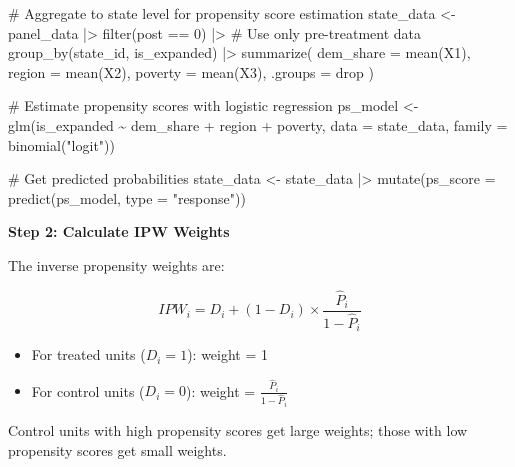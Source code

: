 \documentclass[
  letterpaper,
  DIV=11,
  numbers=noendperiod]{scrreprt}
\newenvironment{Shaded}{\begin{snugshade}}{\end{snugshade}}
\newcommand{\AttributeTok}[1]{\textcolor[rgb]{0.40,0.45,0.13}{#1}}
\newcommand{\CommentTok}[1]{\textcolor[rgb]{0.37,0.37,0.37}{#1}}
\newcommand{\DecValTok}[1]{\textcolor[rgb]{0.68,0.00,0.00}{#1}}
\newcommand{\FunctionTok}[1]{\textcolor[rgb]{0.28,0.35,0.67}{#1}}
\newcommand{\NormalTok}[1]{\textcolor[rgb]{0.00,0.23,0.31}{#1}}
\newcommand{\OtherTok}[1]{\textcolor[rgb]{0.00,0.23,0.31}{#1}}
\newcommand{\SpecialCharTok}[1]{\textcolor[rgb]{0.37,0.37,0.37}{#1}}
\newcommand{\StringTok}[1]{\textcolor[rgb]{0.13,0.47,0.30}{#1}}
\providecommand{\tightlist}{%
  \setlength{\itemsep}{0pt}\setlength{\parskip}{0pt}}
\begin{document}
\begin{Shaded}
\begin{Highlighting}[]
\CommentTok{\# Aggregate to state level for propensity score estimation}
\NormalTok{state\_data }\OtherTok{\textless{}{-}}\NormalTok{ panel\_data }\SpecialCharTok{|\textgreater{}}
    \FunctionTok{filter}\NormalTok{(post }\SpecialCharTok{==} \DecValTok{0}\NormalTok{) }\SpecialCharTok{|\textgreater{}}  \CommentTok{\# Use only pre{-}treatment data}
    \FunctionTok{group\_by}\NormalTok{(state\_id, is\_expanded) }\SpecialCharTok{|\textgreater{}}
    \FunctionTok{summarize}\NormalTok{(}
        \AttributeTok{dem\_share =} \FunctionTok{mean}\NormalTok{(X1),}
        \AttributeTok{region =} \FunctionTok{mean}\NormalTok{(X2),}
        \AttributeTok{poverty =} \FunctionTok{mean}\NormalTok{(X3),}
        \AttributeTok{.groups =} \StringTok{\textquotesingle{}drop\textquotesingle{}}
\NormalTok{    )}

\CommentTok{\# Estimate propensity scores with logistic regression}
\NormalTok{ps\_model }\OtherTok{\textless{}{-}} \FunctionTok{glm}\NormalTok{(is\_expanded }\SpecialCharTok{\textasciitilde{}}\NormalTok{ dem\_share }\SpecialCharTok{+}\NormalTok{ region }\SpecialCharTok{+}\NormalTok{ poverty,}
                \AttributeTok{data =}\NormalTok{ state\_data,}
                \AttributeTok{family =} \FunctionTok{binomial}\NormalTok{(}\StringTok{"logit"}\NormalTok{))}

\CommentTok{\# Get predicted probabilities}
\NormalTok{state\_data }\OtherTok{\textless{}{-}}\NormalTok{ state\_data }\SpecialCharTok{|\textgreater{}}
    \FunctionTok{mutate}\NormalTok{(}\AttributeTok{ps\_score =} \FunctionTok{predict}\NormalTok{(ps\_model, }\AttributeTok{type =} \StringTok{"response"}\NormalTok{))}
\end{Highlighting}
\end{Shaded}

\textbf{Step 2: Calculate IPW Weights}

The inverse propensity weights are:

\[
IPW_i = D_i + (1 - D_i) \times \frac{\hat{P}_i}{1 - \hat{P}_i}
\]

\begin{itemize}
\tightlist
\item
  For treated units (\(D_i = 1\)): weight = 1
\item
  For control units (\(D_i = 0\)): weight =
  \(\frac{\hat{P}_i}{1 - \hat{P}_i}\)
\end{itemize}

Control units with high propensity scores get large weights; those with
low propensity scores get small weights.
\end{document}
